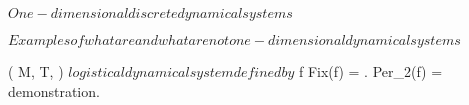 \documentclass[../Main/main]{subfiles}
\begin{document}
\unit{ $ One-dimensional discrete dynamical systems $ }
{
	\introduction
	{ 
		$Examples of what are and what are not one-dimensional dynamical systems$ 
	}

	{
		{
			( M, T, \phi ) $ logistical dynamical system defined by $ f
		}
		\holds
		{
			Fix(f) = .
			Per_2(f) = 
		}
		\demonstration
		{
			demonstration.
		}
	}

}
\end{document}
